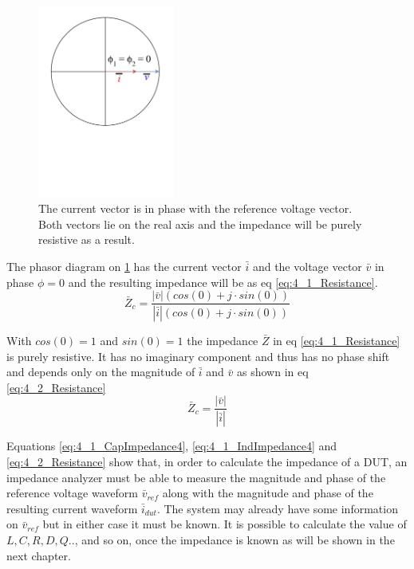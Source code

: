 \begin{figure}[H]
    \centering
    \includegraphics[clip, trim=0 275 0 0, width=0.4\textwidth]{Sections/4_TechnicalAnalysis/Figures/4_1_ResPhasor.pdf}
    \caption{The current vector is in phase with the reference voltage vector. Both vectors lie on the real axis and the impedance will be purely resistive as a result.}
    \label{fig:4_1_ResImpedance}
\end{figure}

The phasor diagram on \ref{fig:4_1_ResImpedance} has the current vector $\bar i$ and the voltage vector $\bar v$ in phase $\phi = 0$ and 
the resulting impedance will be as eq \ref{eq:4_1_Resistance}.
\begin{equation}\label{eq:4_1_Resistance}
    \bar Z_c = \frac{|\bar v| (cos(0) +j\cdot sin(0))}{|\bar i| (cos(0) +j\cdot sin(0))}
\end{equation}

With $cos(0) = 1$ and  $sin(0) = 1$ the impedance $\bar Z$ in eq \ref{eq:4_1_Resistance} is purely resistive. It has no imaginary component and thus has no phase shift and depends only on the magnitude of $\bar i$ and $\bar v$ as shown in eq \ref{eq:4_2_Resistance}
\begin{equation}\label{eq:4_2_Resistance}
    \bar Z_c = \frac{|\bar v|}{|\bar i|}
\end{equation}

Equations \ref{eq:4_1_CapImpedance4}, \ref{eq:4_1_IndImpedance4} and \ref{eq:4_2_Resistance} show that, in order to calculate the impedance of a DUT, an impedance analyzer must be able to measure the magnitude and phase of the reference voltage waveform $\bar v_{ref}$ along with the magnitude and phase of the resulting current waveform $\bar i_{dut}$. The system may already have some information on $\bar v_{ref}$ but in either case it must be known. It is possible to calculate the value of $L, C, R, D, Q..$, and so on, once the impedance is known as will be shown in the next chapter.


